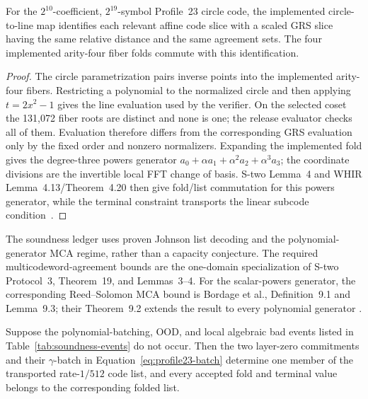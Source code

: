 \begin{lemma}
\label{lem:circle-grs-transport}
For the \(2^{10}\)-coefficient, \(2^{19}\)-symbol Profile~23 circle code,
the implemented circle-to-line map identifies each relevant affine code
slice with a scaled GRS slice having the same relative distance and the same
agreement sets.  The four implemented arity-four fiber folds commute with
this identification.
\end{lemma}

\begin{proof}
The circle parametrization pairs inverse points into the implemented
arity-four fibers.  Restricting a polynomial to the normalized circle and
then applying \(t=2x^2-1\) gives the line evaluation used by the verifier.
On the selected coset the 131,072 fiber roots are distinct and none is one;
the release evaluator checks all of them.  Evaluation therefore differs
from the corresponding GRS evaluation only by the fixed order and nonzero
normalizers.  Expanding the implemented fold gives the degree-three powers
generator \(a_0+\alpha a_1+\alpha^2a_2+\alpha^3a_3\); the coordinate
divisions are the invertible local FFT change of basis.  S-two Lemma~4 and
WHIR Lemma~4.13/Theorem~4.20 then give fold/list commutation for this powers
generator, while the terminal constraint transports the linear subcode
condition~\cite{CarmonEtAl2026Stwo,ArnonChiesaFenziYogev2025WHIR}.
\end{proof}

The soundness ledger uses proven Johnson list decoding and the
polynomial-generator MCA regime, rather than a capacity conjecture.  The
required multicodeword-agreement bounds are the one-domain specialization of
S-two Protocol~3, Theorem~19, and Lemmas~3--4.  For the scalar-powers
generator, the corresponding Reed--Solomon MCA bound is Bordage et al.,
Definition~9.1 and Lemma~9.3; their Theorem~9.2 extends the result to every
polynomial generator
\cite{CarmonEtAl2026Stwo,BordageChiesaGuanManzur2025,Haboeck2025MCA}.

\begin{lemma}
\label{lem:johnson-mca-batch}
Suppose the polynomial-batching, OOD, and local algebraic bad events listed in
Table~\ref{tab:soundness-events} do not occur.  Then the two layer-zero
commitments and their \(\gamma\)-batch in
Equation~\eqref{eq:profile23-batch} determine one member of the transported
rate-\(1/512\) code list, and every accepted fold and terminal value belongs
to the corresponding folded list.
\end{lemma}

